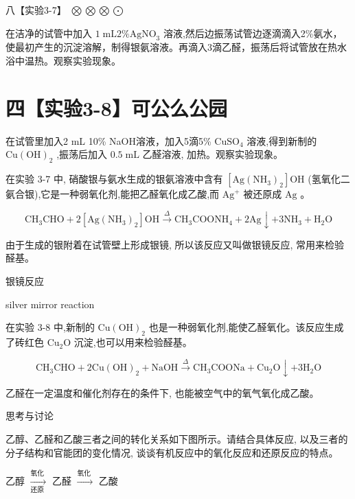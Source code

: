 \documentclass[10pt]{article}
\begin{document}
八【实验3-7】 \(\bigotimes \bigotimes \bigotimes \bigodot\)

在洁净的试管中加入 \(1\mathrm{\;{mL}}2\% {\mathrm{{AgNO}}}_{3}\) 溶液,然后边振荡试管边逐滴滴入2\%氨水，使最初产生的沉淀溶解，制得银氨溶液。再滴入3滴乙醛，振荡后将试管放在热水浴中温热。观察实验现象。

\section*{四【实验3-8】可公么公园}

在试管里加入2 mL 10\% NaOH溶液，加入5滴5\% \({\mathrm{{CuSO}}}_{4}\) 溶液,得到新制的 \(\mathrm{{Cu}}{\left( \mathrm{{OH}}\right) }_{2}\) ,振荡后加入 \({0.5}\mathrm{\;{mL}}\) 乙醛溶液, 加热。观察实验现象。

在实验 3-7 中, 硝酸银与氨水生成的银氨溶液中含有 \(\left\lbrack {\mathrm{{Ag}}{\left( {\mathrm{{NH}}}_{3}\right) }_{2}}\right\rbrack \mathrm{{OH}}\) (氢氧化二氨合银),它是一种弱氧化剂,能把乙醛氧化成乙酸,而 \({\mathrm{{Ag}}}^{ + }\) 被还原成 \(\mathrm{{Ag}}\) 。

\[
{\mathrm{{CH}}}_{3}\mathrm{{CHO}} + 2\left\lbrack {\mathrm{{Ag}}{\left( {\mathrm{{NH}}}_{3}\right) }_{2}}\right\rbrack \mathrm{{OH}}\xrightarrow[]{\Delta }{\mathrm{{CH}}}_{3}{\mathrm{{COONH}}}_{4} + 2\mathrm{{Ag}} \downarrow + 3{\mathrm{{NH}}}_{3} + {\mathrm{H}}_{2}\mathrm{O}
\]

由于生成的银附着在试管壁上形成银镜, 所以该反应又叫做银镜反应, 常用来检验醛基。

\begin{mdframed}

银镜反应

silver mirror reaction

\end{mdframed}

在实验 3-8 中,新制的 \(\mathrm{{Cu}}{\left( \mathrm{{OH}}\right) }_{2}\) 也是一种弱氧化剂,能使乙醛氧化。该反应生成了砖红色 \({\mathrm{{Cu}}}_{2}\mathrm{O}\) 沉淀,也可以用来检验醛基。

\[
{\mathrm{{CH}}}_{3}\mathrm{{CHO}} + 2\mathrm{{Cu}}{\left( \mathrm{{OH}}\right) }_{2} + \mathrm{{NaOH}}\xrightarrow[]{\Delta }{\mathrm{{CH}}}_{3}\mathrm{{COONa}} + {\mathrm{{Cu}}}_{2}\mathrm{O} \downarrow + 3{\mathrm{H}}_{2}\mathrm{O}
\]

乙醛在一定温度和催化剂存在的条件下, 也能被空气中的氧气氧化成乙酸。

\begin{mdframed}

思考与讨论

乙醇、乙醛和乙酸三者之间的转化关系如下图所示。请结合具体反应, 以及三者的分子结构和官能团的变化情况, 谈谈有机反应中的氧化反应和还原反应的特点。

乙醇 \(\xrightarrow[\text{还原 }]{\text{氧化 }}\) 乙醛 \(\xrightarrow[]{\text{氧化 }}\) 乙酸

\end{mdframed}
\end{document}
